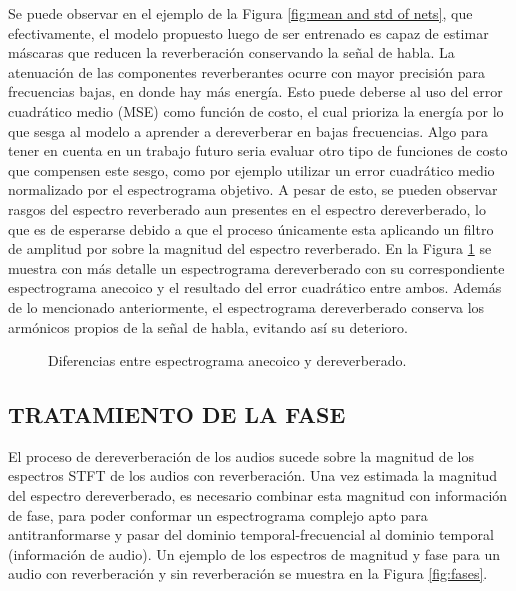 Se puede observar en el ejemplo de la Figura \ref{fig:mean and std of nets}, que efectivamente, el modelo propuesto luego de ser entrenado es capaz de estimar máscaras que reducen la reverberación conservando la señal de habla. 
La atenuación de las componentes reverberantes ocurre con mayor precisión para frecuencias bajas, en donde hay más energía. Esto puede deberse al uso del error cuadrático medio (MSE) como función de costo, el cual prioriza la energía por lo que sesga al modelo a aprender a dereverberar en bajas frecuencias. Algo para tener en cuenta en un trabajo futuro seria evaluar otro tipo de funciones de costo que compensen este sesgo, como por ejemplo utilizar un error cuadrático medio normalizado por el espectrograma objetivo.
A pesar de esto, se pueden observar rasgos del espectro reverberado aun presentes en el espectro dereverberado, lo que es de esperarse debido a que el proceso únicamente esta aplicando un filtro de amplitud por sobre la magnitud del espectro reverberado. En la Figura \ref{fig:zoom} se muestra con más detalle un espectrograma dereverberado con su correspondiente espectrograma anecoico y el resultado del error cuadrático entre ambos. Además de lo mencionado anteriormente, el espectrograma dereverberado conserva los armónicos propios de la señal de habla, evitando así su deterioro.

\begin{figure}[H]\centering
{}\hfill
{}\par 
{}
\caption{Diferencias entre espectrograma anecoico y dereverberado.}
\label{fig:zoom}
\end{figure}


\subsection[Tratamiento de la Fase]{TRATAMIENTO DE LA FASE}
El proceso de dereverberación de los audios sucede sobre la magnitud de los espectros STFT de los audios con reverberación. Una vez estimada la magnitud del espectro dereverberado, es necesario combinar esta magnitud con información de fase, para poder conformar un espectrograma complejo apto para antitranformarse y pasar del dominio temporal-frecuencial al dominio temporal (información de audio). Un ejemplo de los espectros de magnitud y fase para un audio con reverberación y sin reverberación se muestra en la Figura \ref{fig:fases}.

